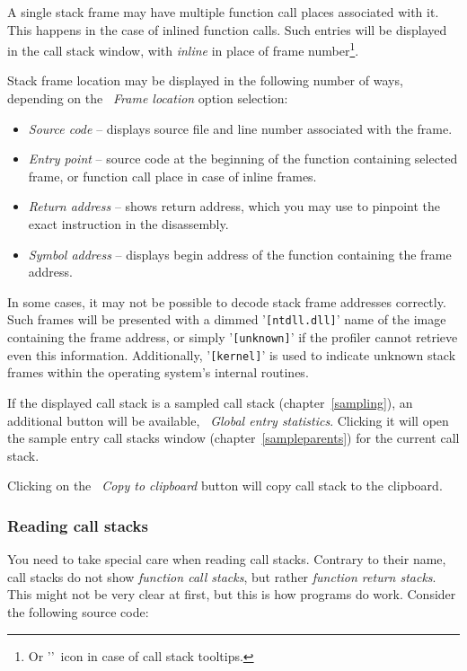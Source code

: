 \documentclass[hidelinks,titlepage,a4paper,twoside]{article}
\begin{document}
A single stack frame may have multiple function call places associated with it. This happens in the case of inlined function calls. Such entries will be displayed in the call stack window, with \emph{inline} in place of frame number\footnote{Or '\faCaretRight{}'~icon in case of call stack tooltips.}.

Stack frame location may be displayed in the following number of ways, depending on the \emph{\faAt{}~Frame location} option selection:

\begin{itemize}
\item \emph{Source code} -- displays source file and line number associated with the frame.
\item \emph{Entry point} -- source code at the beginning of the function containing selected frame, or function call place in case of inline frames.
\item \emph{Return address} -- shows return address, which you may use to pinpoint the exact instruction in the disassembly.
\item \emph{Symbol address} -- displays begin address of the function containing the frame address.
\end{itemize}

In some cases, it may not be possible to decode stack frame addresses correctly. Such frames will be presented with a dimmed '\texttt{[ntdll.dll]}' name of the image containing the frame address, or simply '\texttt{[unknown]}' if the profiler cannot retrieve even this information. Additionally, '\texttt{[kernel]}' is used to indicate unknown stack frames within the operating system's internal routines.

If the displayed call stack is a sampled call stack (chapter~\ref{sampling}), an additional button will be available, \emph{\faDoorOpen{}~Global entry statistics}. Clicking it will open the sample entry call stacks window (chapter~\ref{sampleparents}) for the current call stack.

Clicking on the \emph{\faClipboard{}~Copy to clipboard} button will copy call stack to the clipboard.

\subsubsection{Reading call stacks}
\label{readingcallstacks}

You need to take special care when reading call stacks. Contrary to their name, call stacks do not show \emph{function call stacks}, but rather \emph{function return stacks}. This might not be very clear at first, but this is how programs do work. Consider the following source code:
\end{document}
